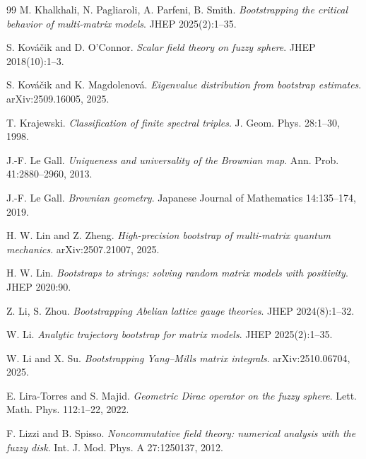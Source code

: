 \documentclass[11pt]{article}
\theoremstyle{plain}
\begin{document}
\begin{thebibliography}{99}
M. Khalkhali, N. Pagliaroli, A. Parfeni, B. Smith.  
\emph{Bootstrapping the critical behavior of multi-matrix models}. JHEP 2025(2):1–35.

S. Kováčik and D. O’Connor. \emph{Scalar field theory on fuzzy sphere}. JHEP 2018(10):1–3.

S. Kováčik and K. Magdolenová. \emph{Eigenvalue distribution from bootstrap estimates}. arXiv:2509.16005, 2025.

T. Krajewski. \emph{Classification of finite spectral triples}. J. Geom. Phys. 28:1–30, 1998.



J.-F. Le Gall.
\emph{Uniqueness and universality of the Brownian map}. Ann. Prob. 41:2880–2960, 2013.

J.-F. Le Gall. \emph{Brownian geometry}. Japanese Journal of Mathematics 14:135–174, 2019.



H. W. Lin and Z. Zheng.
\emph{High-precision bootstrap of multi-matrix quantum mechanics}. arXiv:2507.21007, 2025.

H. W. Lin. \emph{Bootstraps to strings: solving random matrix models with positivity}. JHEP 2020:90.


Z. Li, S. Zhou. \emph{Bootstrapping Abelian lattice gauge theories}. JHEP 2024(8):1–32.

W. Li. \emph{Analytic trajectory bootstrap for matrix models}. JHEP 2025(2):1–35.

W. Li and X. Su. \emph{Bootstrapping Yang–Mills matrix integrals}. arXiv:2510.06704, 2025.

E. Lira-Torres and S. Majid. \emph{Geometric Dirac operator on the fuzzy sphere}. Lett. Math. Phys. 112:1–22, 2022.




F. Lizzi and B. Spisso. \emph{Noncommutative field theory: numerical analysis with the fuzzy disk}. Int. J. Mod. Phys. A 27:1250137, 2012.












\end{thebibliography}
\end{document}
